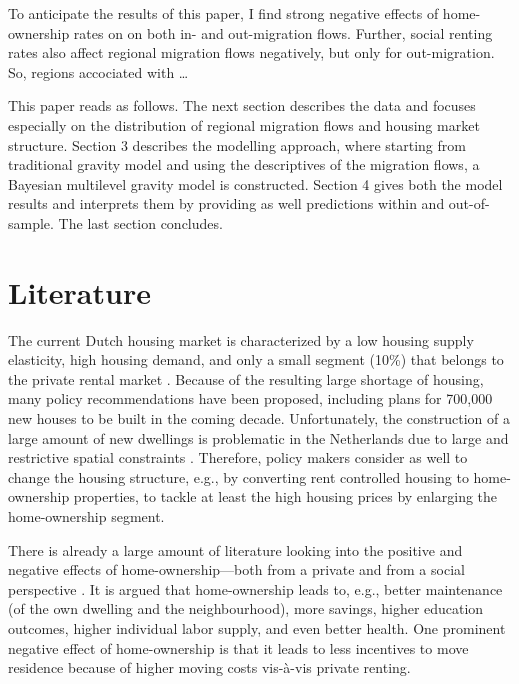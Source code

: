 \documentclass[a4paper,fleqn]{cas-dc}
\begin{document}
To anticipate the results of this paper, I find strong negative effects of
home-ownership rates on on both in- and out-migration flows. Further, social
renting rates also affect regional migration flows negatively, but only for
out-migration. So, regions accociated with \ldots

This paper reads as follows. The next section describes the data and focuses
especially on the distribution of regional migration flows and housing market
structure. Section 3 describes the modelling approach, where starting from
traditional gravity model and using the descriptives of the migration flows, a
Bayesian multilevel gravity model is constructed. Section 4 gives both the model
results and interprets them by providing as well predictions within and
out-of-sample. The last section concludes.

\section{Literature}

The current Dutch housing market is characterized by a low housing supply
elasticity, high housing demand, and only a small segment (10\%) that belongs to
the private rental market \citep{michielsen2017}. Because of the resulting large
shortage of housing, many policy recommendations have been proposed, including
plans for 700,000 new houses to be built in the coming decade. Unfortunately,
the construction of a large amount of new dwellings is problematic in the
Netherlands due to large and restrictive spatial constraints
\citep{michielsen2019}. Therefore, policy makers consider as well to change the
housing structure, e.g., by converting rent controlled housing to home-ownership
properties, to tackle at least the high housing prices by enlarging the
home-ownership segment.

There is already a large amount of literature looking into the positive and
negative effects of home-ownership---both from a private and from a social
perspective \citep[see for an overview][]{dietz2003social}. It is argued that
home-ownership leads to, e.g., better maintenance (of the own dwelling and the
neighbourhood), more savings, higher education outcomes, higher individual labor
supply, and even better health. One prominent negative effect of home-ownership
is that it leads to less incentives to move residence because of higher moving
costs vis-\`{a}-vis private renting.
\end{document}
